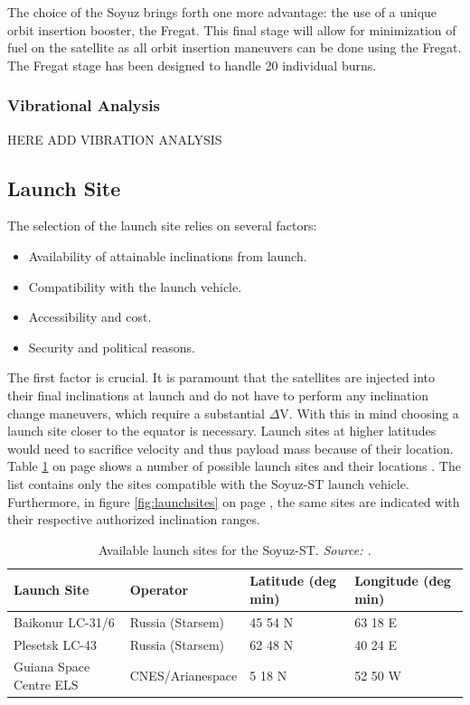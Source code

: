 The choice of the Soyuz brings forth one more advantage: the use of a unique orbit insertion booster, the Fregat. This final stage will allow for minimization of fuel on the satellite as all orbit insertion maneuvers can be done using the Fregat. The Fregat stage has been designed to handle 20 individual burns.

\subsubsection{Vibrational Analysis}
\label{frLVCA}

HERE ADD VIBRATION ANALYSIS  

\subsection{Launch Site}
\label{frLSLS}

The selection of the launch site relies on several factors:

\begin{itemize}
	\item Availability of attainable inclinations from launch.
	\item Compatibility with the launch vehicle.
	\item Accessibility and cost.
	\item Security and political reasons. 
\end{itemize}

The first factor is crucial. It is paramount that the satellites are injected into their final inclinations at launch and do not have to perform any inclination change maneuvers, which require a substantial $\Delta$V. With this in mind choosing a launch site closer to the equator is necessary. Launch sites at higher latitudes would need to sacrifice velocity and thus payload mass because of their location. Table \ref{table:launchtable} on page \pageref{table:launchtable} shows a number of possible launch sites and their locations \cite{larson}. The list contains only the sites compatible with the Soyuz-ST launch vehicle. Furthermore, in figure \ref{fig:launchsites} on page \pageref{fig:launchsites}, the same sites are indicated with their respective authorized inclination ranges.

\begin{table}[!h]
\begin{centering}
\begin{tabular}{llp{2cm}p{2cm}}
\toprule
Launch Site & Operator & Latitude (deg min) & Longitude (deg min) \\
\hline \hline
Baikonur LC-31/6  & Russia (Starsem) & 45 54 N & 63 18 E \\
Plesetsk LC-43  & Russia (Starsem)   &  62 48 N & 40 24 E \\
Guiana Space Centre  ELS  & CNES/Arianespace  & 5 18 N & 52 50 W \\
\bottomrule
\end{tabular}
\caption{Available launch sites for the Soyuz-ST.   \emph{Source: \cite{larson}.}}
\label{table:launchtable}
\end{centering}
\end{table}  

